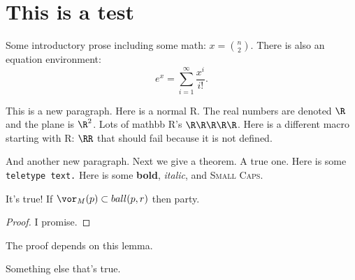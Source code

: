 \section{This is a test} %
\label{sec:this_is_a_test}

Some introductory prose including some math: $x = {n \choose 2}$.
There is also an equation environment:
\[
  e^x = \sum_{i=1}^\infty \frac{x^i}{i!}.
\]

This is a new paragraph. Here is a normal R.
The real numbers are denoted $\R$ and the plane is $\R^2$. Lots of mathbb R's $\R\R\R\R\R$.
Here is a different macro starting with R: $\RR$ that should fail because it is not defined.

And another new paragraph.
Next we give a theorem.  A true one.
Here is some \texttt{teletype text.}
Here is some \textbf{bold}, \emph{italic}, and \textsc{Small Caps}.


  \begin{theorem}\label{thm:true_theorem}
    It's true!  If $\vor_M(p) \subset ball(p,r)$ then party.
  \end{theorem}
  \begin{proof}
    I promise.
  \end{proof}

  The proof depends on this lemma.
  
  \begin{lemma}\label{lem:necessary}
    Something else that's true.
  \end{lemma}


